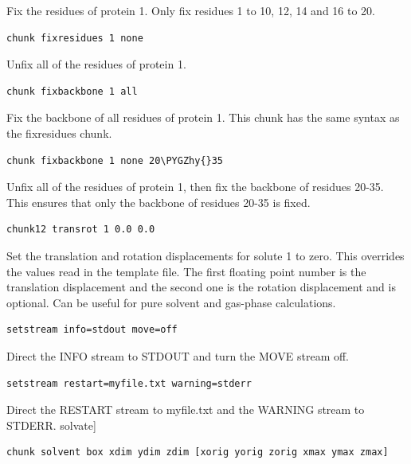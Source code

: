 \documentclass[letterpaper,10pt,english]{sphinxmanual}
\def\PYGZhy{\char`\-}
\begin{document}
Fix the residues of protein 1. Only fix residues 1 to 10, 12, 14 and 16 to 20.

\begin{Verbatim}[commandchars=\\\{\}]
chunk fixresidues 1 none
\end{Verbatim}

Unfix all of the residues of protein 1.

\begin{Verbatim}[commandchars=\\\{\}]
chunk fixbackbone 1 all
\end{Verbatim}

Fix the backbone of all residues of protein 1. This chunk has the same syntax as the fixresidues chunk.

\begin{Verbatim}[commandchars=\\\{\}]
chunk fixbackbone 1 none 20\PYGZhy{}35
\end{Verbatim}

Unfix all of the residues of protein 1, then fix the backbone of residues 20-35. This ensures that only the backbone of residues 20-35 is fixed.

\begin{Verbatim}[commandchars=\\\{\}]
chunk12 transrot 1 0.0 0.0
\end{Verbatim}

Set the translation and rotation displacements for solute 1 to zero. This overrides the values read in the template file. The first floating point number is the translation displacement and the second one is the rotation displacement and is optional. Can be useful for pure solvent and gas-phase calculations.

\begin{Verbatim}[commandchars=\\\{\}]
setstream info=stdout move=off
\end{Verbatim}

Direct the INFO stream to STDOUT and turn the MOVE stream off.

\begin{Verbatim}[commandchars=\\\{\}]
setstream restart=myfile.txt warning=stderr
\end{Verbatim}

Direct the RESTART stream to myfile.txt and the WARNING stream to STDERR. solvate{]}

\begin{Verbatim}[commandchars=\\\{\}]
chunk solvent box xdim ydim zdim [xorig yorig zorig xmax ymax zmax]
\end{Verbatim}
\end{document}
